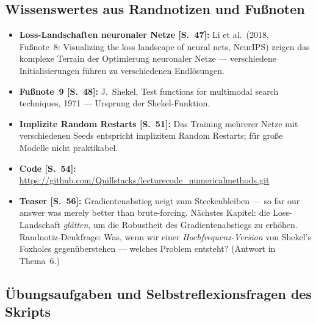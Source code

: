 \subsection{Wissenswertes aus Randnotizen und Fu{\ss}noten}
\begin{itemize}[itemsep=2pt]
  \item \textbf{Loss-Landschaften neuronaler Netze [S.~47]:} Li et al.\ (2018,
        Fu{\ss}note~8: \glqq Visualizing the loss landscape of neural nets\grqq,
        NeurIPS) zeigen das komplexe Terrain der Optimierung neuronaler Netze ---
        verschiedene Initialisierungen führen zu verschiedenen Endlösungen.
  \item \textbf{Fu{\ss}note~9 [S.~48]:} J.~Shekel, \glqq Test functions for multimodal
        search techniques\grqq, 1971 --- Ursprung der Shekel-Funktion.
  \item \textbf{Implizite Random Restarts [S.~51]:} Das Training mehrerer Netze mit
        verschiedenen Seeds entspricht implizitem Random Restarts; für gro{\ss}e
        Modelle nicht praktikabel.
  \item \textbf{Code [S.~54]:}
        \url{https://github.com/Quillstacks/lecturecode_numericalmethods.git}
  \item \textbf{Teaser [S.~56]:} Gradientenabstieg neigt zum Steckenbleiben ---
        \glqq so far our answer was merely better than brute-forcing\grqq. Nächstes
        Kapitel: die Loss-Landschaft \emph{glätten}, um die Robustheit des
        Gradientenabstiegs zu erhöhen. Randnotiz-Denkfrage: Was, wenn wir einer
        \emph{Hochfrequenz-Version} von Shekel's Foxholes gegenüberstehen --- welches
        Problem entsteht? (Antwort in Thema~6.)
\end{itemize}

\subsection{Übungsaufgaben und Selbstreflexionsfragen des Skripts}

